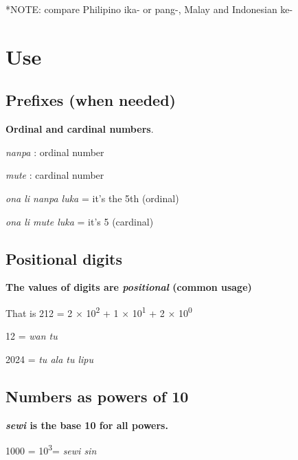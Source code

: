 \documentclass{article}
\begin{document}
\vspace{5pt}	

	*NOTE: compare Philipino ika- or pang-, Malay and Indonesian ke-

\newpage



\section{Use}
	
\subsection{Prefixes (when needed)}

    \textbf{Ordinal and cardinal numbers}.
	
	\textit{nanpa} {}:  ordinal number
	
	\textit{mute} {}: cardinal number
	
	\vspace{5 pt}
	
	\textit{ona li nanpa luka} = it's the 5th (ordinal)
	
	\textit{ona li mute luka} = it's 5 (cardinal) 
	
	
\subsection{Positional digits}
	
	\textbf{The values of digits are \emph{positional} (common usage)}

	\vspace{5 pt}
		
    That is 212 = 2 × 10\textsuperscript{2} + 1 × 10\textsuperscript{1} + 2 × 10\textsuperscript{0}
	
	\vspace{5 pt}
	
	12 = \emph{wan tu}
	
	2024 = \emph{tu ala tu lipu}
	
\subsection{Numbers as powers of 10}
    
   \textbf{ \textit{sewi} is the base 10 for all powers.}
    
    \vspace{5 pt}
	
	1000 = 10\textsuperscript{3}= \emph{sewi sin}
	
\end{document}
